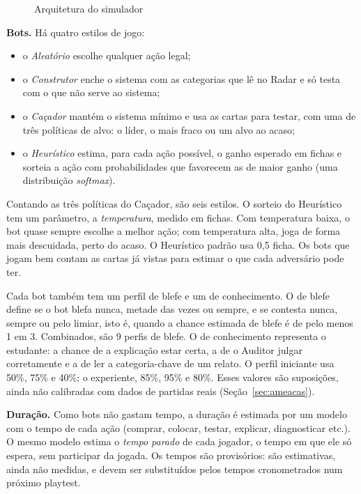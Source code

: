 \begin{figure}[ht]
  \centering
  \resizebox{\linewidth}{!}{}
  \caption{Arquitetura do simulador}
  \label{fig:arquitetura}
\end{figure}

\textbf{Bots.} Há quatro estilos de jogo:
\begin{itemize}
  \item o \emph{Aleatório} escolhe qualquer ação legal;
  \item o \emph{Construtor} enche o sistema com as categorias que lê no Radar e só testa com o que não serve ao
    sistema;
  \item o \emph{Caçador} mantém o sistema mínimo e usa as cartas para testar, com uma de três políticas de alvo:
    o líder, o mais fraco ou um alvo ao acaso;
  \item o \emph{Heurístico} estima, para cada ação possível, o ganho esperado em fichas e sorteia a ação com
    probabilidades que favorecem as de maior ganho (uma distribuição \emph{softmax}).
\end{itemize}
Contando as três políticas do Caçador, são seis estilos. O sorteio do Heurístico tem um parâmetro, a
\emph{temperatura}, medido em fichas. Com temperatura baixa, o bot quase sempre escolhe a melhor ação; com
temperatura alta, joga de forma mais descuidada, perto do acaso. O Heurístico padrão usa 0,5 ficha. Os bots que
jogam bem contam as cartas já vistas para estimar o que cada adversário pode ter.

Cada bot também tem um perfil de blefe e um de conhecimento. O de blefe define se o bot blefa nunca, metade
das vezes ou sempre, e se contesta nunca, sempre ou pelo limiar, isto é, quando a chance estimada de blefe é de
pelo menos 1 em 3. Combinados, são 9 perfis de blefe. O de conhecimento representa o estudante: a chance de a
explicação estar certa, a de o Auditor julgar corretamente e a de ler a categoria-chave de um relato. O perfil
iniciante usa 50\%, 75\% e 40\%; o experiente, 85\%, 95\% e 80\%. Esses valores são suposições, ainda não
calibradas com dados de partidas reais (Seção~\ref{sec:ameacas}).

\textbf{Duração.} Como bots não gastam tempo, a duração é estimada por um modelo com o tempo de cada ação
(comprar, colocar, testar, explicar, diagnosticar etc.). O mesmo modelo estima o \emph{tempo parado} de cada
jogador, o tempo em que ele só espera, sem participar da jogada. Os tempos são provisórios: são
estimativas, ainda não medidas, e devem ser substituídos pelos tempos cronometrados num próximo playtest.

